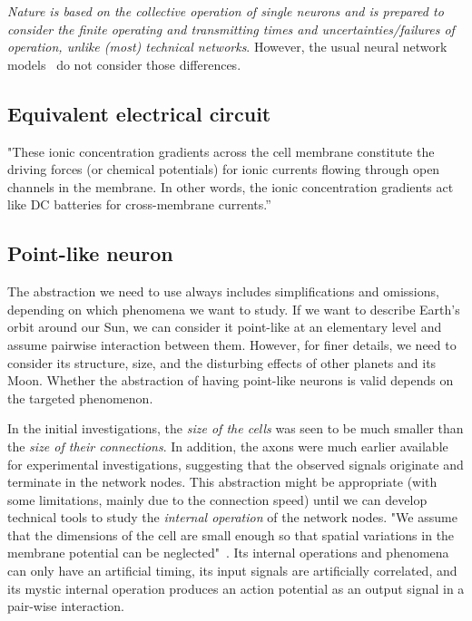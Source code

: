 \textit{Nature is based on the collective operation of single neurons
and is prepared to consider the finite operating and transmitting times and uncertainties/failures of operation, unlike (most) technical networks}.
However, the usual neural network models~\cite{BrainNetworkModels:2018}
do not consider those differences.

\subsection{Equivalent electrical circuit\label{sec:Fallacies-ElectricalCuircuit}}

"These ionic concentration gradients across the cell membrane
constitute the driving forces (or chemical potentials)
for ionic currents flowing through open channels in the membrane.
In other words, the ionic concentration gradients act like DC batteries
for cross-membrane currents.”~\cite{JohnstonWuNeurophysiology:1995}

\subsection{Point-like neuron\label{sec:Physiology-FallaciesPointLike}}

The abstraction we need to use always includes simplifications and omissions,
depending on which phenomena we want to study. If we want to describe Earth's orbit around our Sun, we can consider it point-like at an elementary level and assume pairwise interaction between them.  However, for finer details, we need to consider its structure, size, and the disturbing effects of other planets and its Moon. Whether the abstraction of having point-like neurons is valid depends on the targeted phenomenon.

In the initial investigations, the \textit{size of the cells} was seen
to be much smaller than the \textit{size of their connections}.
In addition, the axons were much earlier available for experimental
investigations, suggesting that the observed signals originate and
terminate in the network nodes. This abstraction might be
appropriate (with some limitations, mainly due to the connection speed)
until we can develop technical tools to study the \textit{internal operation}
of the network nodes. "We assume that the dimensions
of the cell are small enough so that spatial variations in the membrane potential can be neglected"~\cite{KochBiophysics:1999}. Its internal operations and phenomena can only have an artificial timing, its input signals are artificially correlated, and its mystic internal operation produces an action potential as an output signal in a pair-wise interaction.

